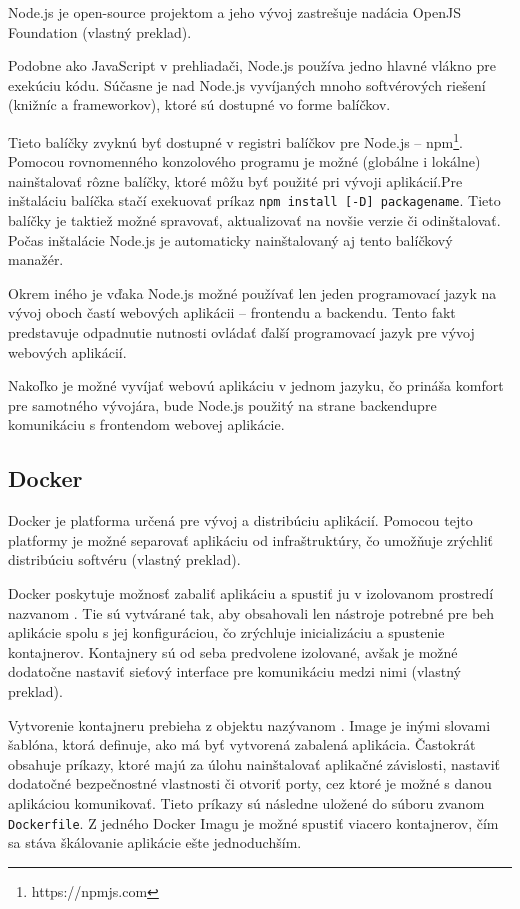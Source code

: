 Node.js je open-source projektom a jeho vývoj zastrešuje nadácia OpenJS Foundation \cite{about_nodejs} (vlastný preklad).

\clearpage
Podobne ako JavaScript v prehliadači, Node.js používa jedno hlavné vlákno pre exekúciu kódu. Súčasne je nad Node.js vyvíjaných mnoho softvérových riešení (knižníc a frameworkov), ktoré sú dostupné vo forme balíčkov.

Tieto balíčky zvyknú byť dostupné v registri balíčkov pre Node.js -- npm\footnote{https://npmjs.com}. Pomocou rovnomenného konzolového programu je možné (globálne i lokálne) nainštalovať rôzne balíčky, ktoré môžu byť použité pri vývoji aplikácií.\newline Pre inštaláciu balíčka stačí exekuovať príkaz \texttt{npm install [-D] packagename}. Tieto balíčky je taktiež možné spravovať, aktualizovať na novšie verzie či odinštalovať. Počas inštalácie Node.js je automaticky nainštalovaný aj tento balíčkový manažér.

Okrem iného je vďaka Node.js možné používať len jeden programovací jazyk na vývoj oboch častí webových aplikácii -- frontendu a backendu. Tento fakt predstavuje odpadnutie nutnosti ovládať ďalší programovací jazyk pre vývoj webových aplikácií.

Nakoľko je možné vyvíjať webovú aplikáciu v jednom jazyku, čo prináša komfort pre samotného vývojára, bude Node.js použitý na strane backendu\newline pre komunikáciu s frontendom webovej aplikácie.

\subsection {Docker}
Docker je platforma určená pre vývoj a distribúciu aplikácií. Pomocou tejto platformy je možné separovať aplikáciu od infraštruktúry, čo umožňuje zrýchliť distribúciu softvéru \cite{about_docker} (vlastný preklad).

Docker poskytuje možnosť zabaliť aplikáciu a spustiť ju v izolovanom prostredí nazvanom . Tie sú vytvárané tak, aby obsahovali len nástroje potrebné pre beh aplikácie spolu s jej konfiguráciou, čo zrýchluje inicializáciu a spustenie kontajnerov. Kontajnery sú od seba predvolene izolované, avšak je možné dodatočne nastaviť sieťový interface pre komunikáciu medzi nimi \cite{about_docker} (vlastný preklad).

\clearpage

Vytvorenie kontajneru prebieha z objektu nazývanom . Image je inými slovami šablóna, ktorá definuje, ako má byť vytvorená zabalená aplikácia. Častokrát obsahuje príkazy, ktoré majú za úlohu nainštalovať aplikačné závislosti, nastaviť dodatočné bezpečnostné vlastnosti či otvoriť porty, cez ktoré je možné s danou aplikáciou komunikovať. Tieto príkazy sú následne uložené do súboru zvanom \texttt{Dockerfile}. Z jedného Docker Imagu je možné spustiť viacero kontajnerov, čím sa stáva škálovanie aplikácie ešte jednoduchším.

